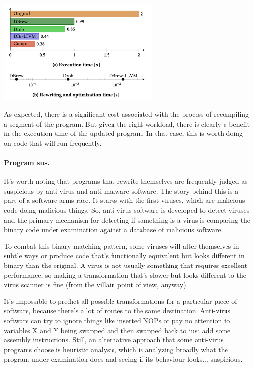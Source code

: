 \documentclass[a4paper]{report}
\begin{document}
\begin{center}
	\includegraphics[width=0.6\textwidth]{images/rewriting.png}
\end{center}

As expected, there is a significant cost associated with the process of recompiling a segment of the program. But given the right workload, there is clearly a benefit in the execution time of the updated program. In that case, this is worth doing on code that will run frequently.

\paragraph{Program sus.}
It's worth noting that programs that rewrite themselves are frequently judged as suspicious by anti-virus and anti-malware software. The story behind this is a part of a software arms race. It starts with the first viruses, which are malicious code doing malicious things. So, anti-virus software is developed to detect viruses and the primary mechanism for detecting if something is a virus is comparing the binary code under examination against a database of malicious software.

To combat this binary-matching pattern, some viruses will alter themselves in subtle ways or produce code that's functionally equivalent but looks different in binary than the original. A virus is not usually something that requires excellent performance, so making a transformation that's slower but looks different to the virus scanner is fine (from the villain point of view, anyway).

It's impossible to predict all possible transformations for a particular piece of software, because there's a lot of routes to the same destination. Anti-virus software can try to ignore things like inserted NOPs or pay no attention to variables X and Y being swapped and then swapped back to just add some assembly instructions. Still, an alternative approach that some anti-virus programs choose is heuristic analysis, which is analyzing broadly what the program under examination does and seeing if its behaviour looks... suspicious.
\end{document}
